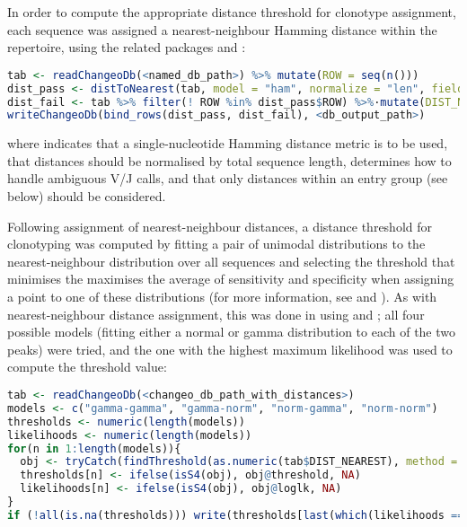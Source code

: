 In order to compute the appropriate distance threshold for clonotype assignment, each sequence was assigned a nearest-neighbour Hamming distance within the repertoire, using the related  packages  and :

\begin{lstlisting}[language=R]
tab <- readChangeoDb(<named_db_path>) %>% mutate(ROW = seq(n()))
dist_pass <- distToNearest(tab, model = "ham", normalize = "len", fields = <group_field>, first = FALSE)
dist_fail <- tab %>% filter(! ROW %in% dist_pass$ROW) %>%·mutate(DIST_NEAREST = NA) 
writeChangeoDb(bind_rows(dist_pass, dist_fail), <db_output_path>)
\end{lstlisting}

\noindent where  indicates that a single-nucleotide Hamming distance metric is to be used,  that distances should be normalised by total sequence length,  determines how to handle ambiguous V/J calls, and  that only distances within an entry group (see below) should be considered.

Following assignment of nearest-neighbour distances, a distance threshold for clonotyping was computed by fitting a pair of unimodal distributions to the nearest-neighbour distribution over all sequences and selecting the threshold that minimises the maximises the average of sensitivity and specificity when assigning a point to one of these distributions (for more information, see  and \parencite{nouri2018threshold}). As with nearest-neighbour distance assignment, this was done in  using  and ; all four possible models (fitting either a normal or gamma distribution to each of the two peaks) were tried, and the one with the highest maximum likelihood was used to compute the threshold value:

\begin{lstlisting}[language=R]
tab <- readChangeoDb(<changeo_db_path_with_distances>)
models <- c("gamma-gamma", "gamma-norm", "norm-gamma", "norm-norm")
thresholds <- numeric(length(models))
likelihoods <- numeric(length(models))
for(n in 1:length(models)){
  obj <- tryCatch(findThreshold(as.numeric(tab$DIST_NEAREST), method = "gmm", model = "hmm", cutoff = "opt"), error = function(e) return(e$message), warning = function(w) return(w$message))
  thresholds[n] <- ifelse(isS4(obj), obj@threshold, NA)
  likelihoods[n] <- ifelse(isS4(obj), obj@loglk, NA)
}
if (!all(is.na(thresholds))) write(thresholds[last(which(likelihoods == max(likelihoods, na.rm = TRUE))], <threshold_output_path>)
\end{lstlisting} 

